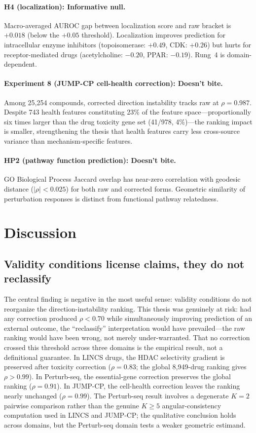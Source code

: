 \documentclass{article}
\begin{document}
\paragraph{H4 (localization): Informative null.}
Macro-averaged AUROC gap between localization score and raw bracket is $+0.018$
(below the $+0.05$ threshold). Localization improves prediction for
intracellular enzyme inhibitors (topoisomerase: $+0.49$, CDK: $+0.26$)
but hurts for receptor-mediated drugs (acetylcholine: $-0.20$, PPAR: $-0.19$).
Rung~4 is domain-dependent.

\paragraph{Experiment 8 (JUMP-CP cell-health correction): Doesn't bite.}
Among 25{,}254 compounds, corrected direction instability tracks raw at
$\rho = 0.987$. Despite 743 health features constituting 23\% of the
feature space---proportionally six times larger than the drug toxicity
gene set (41/978, 4\%)---the ranking impact is smaller, strengthening
the thesis that health features carry less cross-source variance than
mechanism-specific features.

\paragraph{HP2 (pathway function prediction): Doesn't bite.}
GO Biological Process Jaccard overlap has near-zero correlation with
geodesic distance ($|\rho| < 0.025$) for both raw and corrected forms.
Geometric similarity of perturbation responses is distinct from functional
pathway relatedness.

\section{Discussion}

\subsection{Validity conditions license claims, they do not reclassify}

The central finding is negative in the most useful sense: validity conditions
do not reorganize the direction-instability ranking. This thesis was
genuinely at risk: had any correction produced $\rho < 0.70$ while
simultaneously improving prediction of an external outcome, the
``reclassify'' interpretation would have prevailed---the raw ranking
would have been wrong, not merely under-warranted. That no correction
crossed this threshold across three domains is the empirical result,
not a definitional guarantee. In LINCS drugs, the
HDAC selectivity gradient is preserved after toxicity correction ($\rho =
0.83$; the global 8{,}949-drug ranking gives $\rho > 0.99$). In Perturb-seq,
the essential-gene correction preserves the global ranking ($\rho = 0.91$).
In JUMP-CP, the cell-health correction leaves the ranking nearly unchanged
($\rho = 0.99$). The Perturb-seq result involves a degenerate $K = 2$
pairwise comparison rather than the genuine $K \geq 5$ angular-consistency
computation used in LINCS and JUMP-CP; the qualitative
conclusion holds across domains, but the Perturb-seq domain tests a weaker
geometric estimand.
\end{document}

